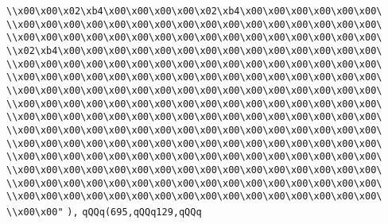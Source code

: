 \verb|\\x00\x00\x02\xb4\x00\x00\x00\x00\x02\xb4\x00\x00\x00\x00\x00\x00\|\newline
\verb|\\x00\x00\x00\x00\x00\x00\x00\x00\x00\x00\x00\x00\x00\x00\x00\x00\|\newline
\verb|\\x00\x00\x00\x00\x00\x00\x00\x00\x00\x00\x00\x00\x00\x00\x00\x00\|\newline
\verb|\\x02\xb4\x00\x00\x00\x00\x00\x00\x00\x00\x00\x00\x00\x00\x00\x00\|\newline
\verb|\\x00\x00\x00\x00\x00\x00\x00\x00\x00\x00\x00\x00\x00\x00\x00\x00\|\newline
\verb|\\x00\x00\x00\x00\x00\x00\x00\x00\x00\x00\x00\x00\x00\x00\x00\x00\|\newline
\verb|\\x00\x00\x00\x00\x00\x00\x00\x00\x00\x00\x00\x00\x00\x00\x00\x00\|\newline
\verb|\\x00\x00\x00\x00\x00\x00\x00\x00\x00\x00\x00\x00\x00\x00\x00\x00\|\newline
\verb|\\x00\x00\x00\x00\x00\x00\x00\x00\x00\x00\x00\x00\x00\x00\x00\x00\|\newline
\verb|\\x00\x00\x00\x00\x00\x00\x00\x00\x00\x00\x00\x00\x00\x00\x00\x00\|\newline
\verb|\\x00\x00\x00\x00\x00\x00\x00\x00\x00\x00\x00\x00\x00\x00\x00\x00\|\newline
\verb|\\x00\x00\x00\x00\x00\x00\x00\x00\x00\x00\x00\x00\x00\x00\x00\x00\|\newline
\verb|\\x00\x00\x00\x00\x00\x00\x00\x00\x00\x00\x00\x00\x00\x00\x00\x00\|\newline
\verb|\\x00\x00\x00\x00\x00\x00\x00\x00\x00\x00\x00\x00\x00\x00\x00\x00\|\newline
\verb|\\x00\x00\x00\x00\x00\x00\x00\x00\x00\x00\x00\x00\x00\x00\x00\x00\|\newline
\verb|\\x00\x00"|\newline
\verb|),|\newline
\verb|qQQq(695,qQQq129,qQQq|\newline
